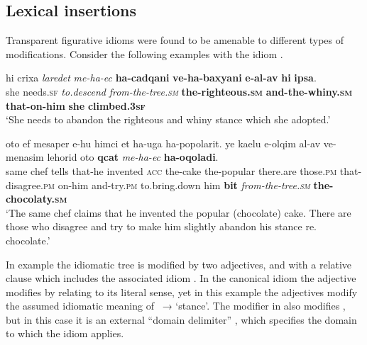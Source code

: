 \documentclass[output=paper]{langsci/langscibook}
\begin{document}
\subsection{Lexical insertions}
\label{she:sec:li}
Transparent figurative idioms were found to be amenable to different types of modifications. Consider the following examples with the idiom .

    \ea\label{she:ec-rc-mod}
        \gll hi crixa \textit{laredet} \textit{me-ha-{\ayin}ec} \textbf{ha-cadqani} \textbf{ve-ha-baxyani} \textbf{{\shinB}e-{\ayinB}al-av} \textbf{hi} \textbf{{\tetB}ipsa}.\\
            she needs.\textsc{sf} \textit{to.descend} \textit{from-the-tree.\textsc{sm}} \textbf{the-righteous.\textsc{sm}} \textbf{and-the-whiny.\textsc{sm}} \textbf{that-on-him} \textbf{she} \textbf{climbed.\textsc{3sf}}\\
        \glt `She needs to abandon the righteous and whiny stance which she adopted.'
    \z

    \ea\label{she:ec-ins-int-ext-mod}
        \gll {\alef}oto {\shin}ef mesaper {\shin}e-hu himci {\alef}et ha-{\ayin}uga ha-popolarit. ye{\shin} ka{\alef}elu {\shin}e-{\het}olqim {\ayin}al-av ve-menasim lehorid {\alef}oto \textbf{qcat} \textit{me-ha-{\ayin}ec} \textbf{ha-{\shinB}oqoladi}.\\
            same chef tells that-he invented \textsc{acc} the-cake the-popular there.are those.\textsc{pm} that-disagree.\textsc{pm} on-him and-try.\textsc{pm} to.bring.down him \textbf{bit} \textit{from-the-tree.\textsc{sm}} \textbf{the-chocolaty.\textsc{sm}}\\
        \glt `The same chef claims that he invented the popular (chocolate) cake. There are those who disagree and try to make him slightly abandon his stance re. chocolate.'
    \z

In example  the idiomatic tree is modified by two adjectives, and with a relative clause which includes the associated idiom . In the canonical idiom the adjective  modifies  by relating to its literal sense, yet in this example the adjectives modify the assumed idiomatic meaning of ~→ `stance'. The modifier  in  also modifies , but in this case it is an external ``domain delimiter'' \citep{ernst81}, which specifies the domain to which the idiom applies.
\end{document}
